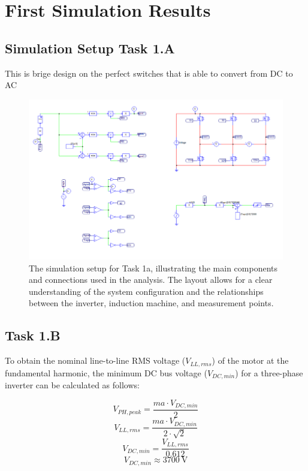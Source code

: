 \documentclass[12pt,a4paper]{report}
\begin{document}
\chapter{First Simulation Results}
\label{ch:first-simulation-results}



\section{Simulation Setup Task 1.A}
This is brige design on the perfect switches that is able to convert from DC to AC
\label{sec:sim-setup-1a}


\begin{figure}[H]
    \centering
    \includegraphics[width=0.6\paperwidth,keepaspectratio,angle=90]{1ASim.png}
    \caption{The simulation setup for Task 1a, illustrating the main components and connections used in the analysis. The layout allows for a clear understanding of the system configuration and the relationships between the inverter, induction machine, and measurement points.}
    \label{fig:sim-setup-1a}
\end{figure}


\section{Task 1.B}
\label{sec:task-1b}

To obtain the nominal line-to-line RMS voltage ($V_{LL,rms}$) of the motor at the fundamental harmonic, the minimum DC bus voltage ($V_{DC,min}$) for a three-phase inverter can be calculated as follows:

\begin{equation}
    V_{PH,peak} = \frac{ma \cdot V_{DC,min}}{2}
\end{equation}
\begin{equation}
    V_{LL,rms} = \frac{ma \cdot V_{DC,min}}{2 \cdot \sqrt{2}}
\end{equation}
\begin{equation}
    V_{DC,min} = \frac{V_{LL,rms}}{0.612}
\end{equation}
\begin{equation}
    V_{DC,min} \approx 3700~\text{V}
\end{equation}
\end{document}
